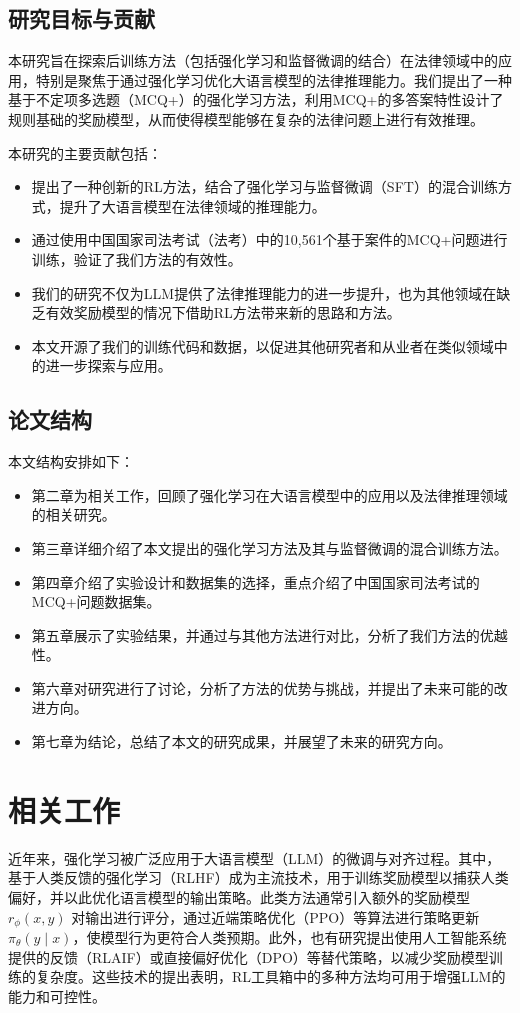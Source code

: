 \documentclass{pkuthesis}
\begin{document}
\subsection{研究目标与贡献}
本研究旨在探索后训练方法（包括强化学习和监督微调的结合）在法律领域中的应用，特别是聚焦于通过强化学习优化大语言模型的法律推理能力。我们提出了一种基于不定项多选题（MCQ+）的强化学习方法，利用MCQ+的多答案特性设计了规则基础的奖励模型，从而使得模型能够在复杂的法律问题上进行有效推理。

本研究的主要贡献包括：
\begin{itemize}
    \item 提出了一种创新的RL方法，结合了强化学习与监督微调（SFT）的混合训练方式，提升了大语言模型在法律领域的推理能力。
    \item 通过使用中国国家司法考试（法考）中的10,561个基于案件的MCQ+问题进行训练，验证了我们方法的有效性。
    \item 我们的研究不仅为LLM提供了法律推理能力的进一步提升，也为其他领域在缺乏有效奖励模型的情况下借助RL方法带来新的思路和方法。
    \item 本文开源了我们的训练代码和数据，以促进其他研究者和从业者在类似领域中的进一步探索与应用。
\end{itemize}

\subsection{论文结构}
本文结构安排如下：
\begin{itemize}
    \item 第二章为相关工作，回顾了强化学习在大语言模型中的应用以及法律推理领域的相关研究。
    \item 第三章详细介绍了本文提出的强化学习方法及其与监督微调的混合训练方法。
    \item 第四章介绍了实验设计和数据集的选择，重点介绍了中国国家司法考试的MCQ+问题数据集。
    \item 第五章展示了实验结果，并通过与其他方法进行对比，分析了我们方法的优越性。
    \item 第六章对研究进行了讨论，分析了方法的优势与挑战，并提出了未来可能的改进方向。
    \item 第七章为结论，总结了本文的研究成果，并展望了未来的研究方向。
\end{itemize}

\section{相关工作}
近年来，强化学习被广泛应用于大语言模型（LLM）的微调与对齐过程。其中，基于人类反馈的强化学习（RLHF）成为主流技术，用于训练奖励模型以捕获人类偏好，并以此优化语言模型的输出策略。此类方法通常引入额外的奖励模型 $r_{\phi}(x, y)$ 对输出进行评分，通过近端策略优化（PPO）等算法进行策略更新 $\pi_{\theta}(y \mid x)$，使模型行为更符合人类预期。此外，也有研究提出使用人工智能系统提供的反馈（RLAIF）或直接偏好优化（DPO）等替代策略，以减少奖励模型训练的复杂度。这些技术的提出表明，RL工具箱中的多种方法均可用于增强LLM的能力和可控性。
\end{document}
